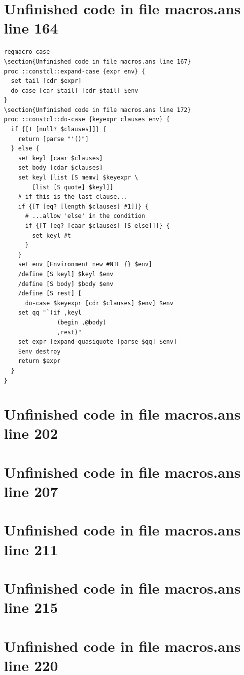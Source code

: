 \documentclass[twoside,9pt]{report}
\begin{document}
\section{Unfinished code in file macros.ans line 164}
\begin{lstlisting}
regmacro case
\section{Unfinished code in file macros.ans line 167}
proc ::constcl::expand-case {expr env} {
  set tail [cdr $expr]
  do-case [car $tail] [cdr $tail] $env
}
\section{Unfinished code in file macros.ans line 172}
proc ::constcl::do-case {keyexpr clauses env} {
  if {[T [null? $clauses]]} {
    return [parse "'()"]
  } else {
    set keyl [caar $clauses]
    set body [cdar $clauses]
    set keyl [list [S memv] $keyexpr \
        [list [S quote] $keyl]]
    # if this is the last clause...
    if {[T [eq? [length $clauses] #1]]} {
      # ...allow 'else' in the condition
      if {[T [eq? [caar $clauses] [S else]]]} {
        set keyl #t
      }
    }
    set env [Environment new #NIL {} $env]
    /define [S keyl] $keyl $env
    /define [S body] $body $env
    /define [S rest] [
      do-case $keyexpr [cdr $clauses] $env] $env
    set qq "`(if ,keyl
               (begin ,@body)
               ,rest)"
    set expr [expand-quasiquote [parse $qq] $env]
    $env destroy
    return $expr
  }
}
\end{lstlisting}
\section{Unfinished code in file macros.ans line 202}
\section{Unfinished code in file macros.ans line 207}
\section{Unfinished code in file macros.ans line 211}
\section{Unfinished code in file macros.ans line 215}
\section{Unfinished code in file macros.ans line 220}
\end{document}
